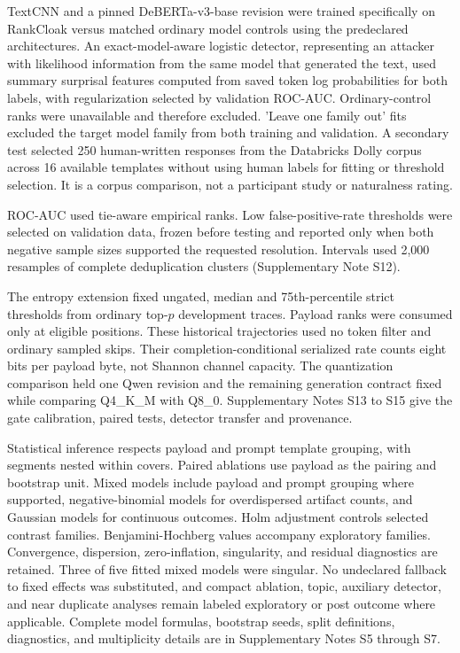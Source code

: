 \documentclass[fleqn,10pt]{wlscirep}
\begin{document}
TextCNN and a pinned DeBERTa-v3-base revision were trained specifically on RankCloak versus matched ordinary model controls using the predeclared architectures. An exact-model-aware logistic detector, representing an attacker with likelihood information from the same model that generated the text, used summary surprisal features computed from saved token log probabilities for both labels, with regularization selected by validation ROC-AUC. Ordinary-control ranks were unavailable and therefore excluded. 'Leave one family out' fits excluded the target model family from both training and validation. A secondary test selected 250 human-written responses from the Databricks Dolly corpus across 16 available templates without using human labels for fitting or threshold selection. It is a corpus comparison, not a participant study or naturalness rating.

ROC-AUC used tie-aware empirical ranks. Low false-positive-rate thresholds were selected on validation data, frozen before testing and reported only when both negative sample sizes supported the requested resolution. Intervals used 2,000 resamples of complete deduplication clusters (Supplementary Note S12).

The entropy extension fixed ungated, median and 75th-percentile strict thresholds from ordinary top-\(p\) development traces. Payload ranks were consumed only at eligible positions. These historical trajectories used no token filter and ordinary sampled skips. Their completion-conditional serialized rate counts eight bits per payload byte, not Shannon channel capacity. The quantization comparison held one Qwen revision and the remaining generation contract fixed while comparing Q4\_K\_M with Q8\_0. Supplementary Notes S13 to S15 give the gate calibration, paired tests, detector transfer and provenance.

Statistical inference respects payload and prompt template grouping, with segments nested within covers. Paired ablations use payload as the pairing and bootstrap unit. Mixed models include payload and prompt grouping where supported, negative-binomial models for overdispersed artifact counts, and Gaussian models for continuous outcomes\cite{Bates2015lme4,Brooks2017glmmTMB}. Holm adjustment controls selected contrast families. Benjamini-Hochberg values accompany exploratory families. Convergence, dispersion, zero-inflation, singularity, and residual diagnostics are retained. Three of five fitted mixed models were singular. No undeclared fallback to fixed effects was substituted, and compact ablation, topic, auxiliary detector, and near duplicate analyses remain labeled exploratory or post outcome where applicable. Complete model formulas, bootstrap seeds, split definitions, diagnostics, and multiplicity details are in Supplementary Notes S5 through S7.
\end{document}
